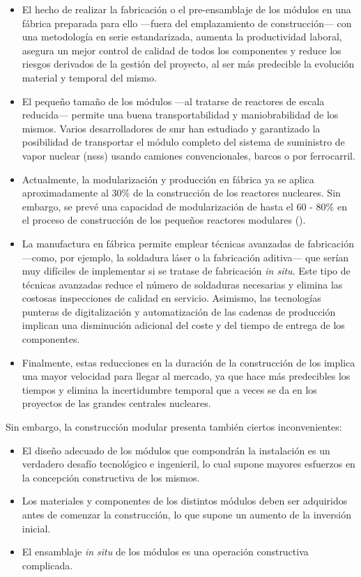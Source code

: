 \begin{itemize}
  \item El hecho de realizar la fabricación o el pre-ensamblaje de los módulos en una fábrica preparada para ello ---fuera del emplazamiento de construcción--- con una metodología en serie estandarizada, aumenta la productividad laboral, asegura un mejor control de calidad de todos los componentes y reduce los riesgos derivados de la gestión del proyecto, al ser más predecible la evolución material y temporal del mismo.
  \item El pequeño tamaño de los módulos ---al tratarse de reactores de escala reducida--- permite una buena transportabilidad y maniobrabilidad de los mismos. Varios desarrolladores de \acrshort{smr} han estudiado y garantizado la posibilidad de transportar el módulo completo del sistema de suministro de vapor nuclear (\acrshort{nsss}) usando camiones convencionales, barcos o por ferrocarril.
  \item Actualmente, la modularización y producción en fábrica ya se aplica aproximadamente al 30\% de la construcción de los reactores nucleares. Sin embargo, se prevé una capacidad de modularización de hasta el 60 - 80\% en el proceso de construcción de los pequeños reactores modulares (\cite{nea_unlocking_2020}).
  \item La manufactura en fábrica permite emplear técnicas avanzadas de fabricación ---como, por ejemplo, la soldadura láser o la fabricación aditiva--- que serían muy difíciles de implementar si se tratase de fabricación \emph{in situ}. Este tipo de técnicas avanzadas reduce el número de soldaduras necesarias y elimina las costosas inspecciones de calidad en servicio. Asimismo, las tecnologías punteras de digitalización y automatización de las cadenas de producción implican una disminución adicional del coste y del tiempo de entrega de los componentes.
  \item Finalmente, estas reducciones en la duración de la construcción de los  implica una mayor velocidad para llegar al mercado, ya que hace más predecibles los tiempos y elimina la incertidumbre temporal que a veces se da en los proyectos de las grandes centrales nucleares.
\end{itemize}

Sin embargo, la construcción modular presenta también ciertos inconvenientes:

\begin{itemize}
  \item El diseño adecuado de los módulos que compondrán la instalación es un verdadero desafío tecnológico e ingenieril, lo cual supone mayores esfuerzos en la concepción constructiva de los mismos.
  \item Los materiales y componentes de los distintos módulos deben ser adquiridos antes de comenzar la construcción, lo que supone un aumento de la inversión inicial.
  \item El ensamblaje \textit{in situ} de los módulos es una operación constructiva complicada.
\end{itemize}

